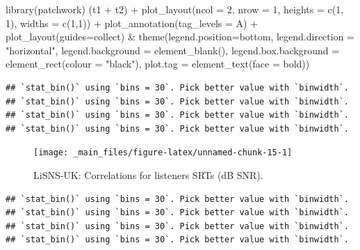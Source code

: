 \documentclass[a4paper, twoside]{templates/ociamthesis}
\newenvironment{Shaded}{\begin{snugshade}}{\end{snugshade}}
\newcommand{\AttributeTok}[1]{\textcolor[rgb]{0.77,0.63,0.00}{#1}}
\newcommand{\DecValTok}[1]{\textcolor[rgb]{0.00,0.00,0.81}{#1}}
\newcommand{\FunctionTok}[1]{\textcolor[rgb]{0.00,0.00,0.00}{#1}}
\newcommand{\NormalTok}[1]{#1}
\newcommand{\SpecialCharTok}[1]{\textcolor[rgb]{0.00,0.00,0.00}{#1}}
\newcommand{\StringTok}[1]{\textcolor[rgb]{0.31,0.60,0.02}{#1}}
\renewenvironment{Shaded}
{
  \vspace{4pt}%
  \begin{snugshade}%
}{%
  \end{snugshade}%
  \vspace{4pt}%
}
\begin{document}
\begin{Shaded}
\begin{Highlighting}[]
\FunctionTok{library}\NormalTok{(patchwork)}
\NormalTok{(t1 }\SpecialCharTok{+}\NormalTok{ t2) }\SpecialCharTok{+} \FunctionTok{plot\_layout}\NormalTok{(}\AttributeTok{ncol =} \DecValTok{2}\NormalTok{, }\AttributeTok{nrow =} \DecValTok{1}\NormalTok{, }\AttributeTok{heights =} \FunctionTok{c}\NormalTok{(}\DecValTok{1}\NormalTok{, }\DecValTok{1}\NormalTok{), }\AttributeTok{widths =} \FunctionTok{c}\NormalTok{(}\DecValTok{1}\NormalTok{,}\DecValTok{1}\NormalTok{)) }\SpecialCharTok{+} \FunctionTok{plot\_annotation}\NormalTok{(}\AttributeTok{tag\_levels =} \StringTok{\textquotesingle{}A\textquotesingle{}}\NormalTok{) }\SpecialCharTok{+} \FunctionTok{plot\_layout}\NormalTok{(}\AttributeTok{guides=}\StringTok{\textquotesingle{}collect\textquotesingle{}}\NormalTok{) }\SpecialCharTok{\&}
  \FunctionTok{theme}\NormalTok{(}\AttributeTok{legend.position=}\StringTok{\textquotesingle{}bottom\textquotesingle{}}\NormalTok{,        }
        \AttributeTok{legend.direction =} \StringTok{"horizontal"}\NormalTok{,}
        \AttributeTok{legend.background =} \FunctionTok{element\_blank}\NormalTok{(),}
        \AttributeTok{legend.box.background =} \FunctionTok{element\_rect}\NormalTok{(}\AttributeTok{colour =} \StringTok{"black"}\NormalTok{),}
        \AttributeTok{plot.tag =} \FunctionTok{element\_text}\NormalTok{(}\AttributeTok{face =} \StringTok{\textquotesingle{}bold\textquotesingle{}}\NormalTok{))}
\end{Highlighting}
\end{Shaded}

\begin{verbatim}
## `stat_bin()` using `bins = 30`. Pick better value with `binwidth`.
## `stat_bin()` using `bins = 30`. Pick better value with `binwidth`.
## `stat_bin()` using `bins = 30`. Pick better value with `binwidth`.
## `stat_bin()` using `bins = 30`. Pick better value with `binwidth`.
\end{verbatim}

\begin{figure}

{\centering \texttt{[image: \_main\_files/figure-latex/unnamed-chunk-15-1]} 

}

\caption{LiSNS-UK: Correlations for listeners SRTs (dB SNR).}\label{fig:unnamed-chunk-15}
\end{figure}

\begin{verbatim}
## `stat_bin()` using `bins = 30`. Pick better value with `binwidth`.
## `stat_bin()` using `bins = 30`. Pick better value with `binwidth`.
## `stat_bin()` using `bins = 30`. Pick better value with `binwidth`.
## `stat_bin()` using `bins = 30`. Pick better value with `binwidth`.
\end{verbatim}
\end{document}
